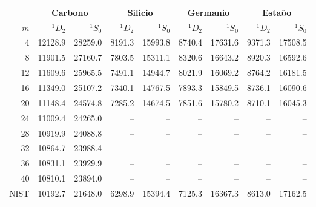 \begin{tabular}{rrrrrrrrr}
    \toprule
     & \multicolumn{2}{c}{\textbf{Carbono}} & \multicolumn{2}{c}{\textbf{Silicio}} & \multicolumn{2}{c}{\textbf{Germanio}} & \multicolumn{2}{c}{\textbf{Estaño}} \\
    $m$ & $^1D_2$ & $^1S_0$ & $^1D_2$ & $^1S_0$ & $^1D_2$ & $^1S_0$ & $^1D_2$ & $^1S_0$ \\
    \midrule
    4 & 12128.9 & 28259.0 & 8191.3 & 15993.8 & 8740.4 & 17631.6 & 9371.3 & 17508.5 \\
    8 & 11901.5 & 27160.7 & 7803.5 & 15311.1 & 8320.6 & 16643.2 & 8920.3 & 16592.6 \\
    12 & 11609.6 & 25965.5 & 7491.1 & 14944.7 & 8021.9 & 16069.2 & 8764.2 & 16181.5 \\
    16 & 11349.0 & 25107.2 & 7340.1 & 14767.5 & 7893.3 & 15849.5 & 8736.1 & 16090.6 \\
    20 & 11148.4 & 24574.8 & 7285.2 & 14674.5 & 7851.6 & 15780.2 & 8710.1 & 16045.3 \\
    24 & 11009.4 & 24265.0 & -- & -- & -- & -- & -- & -- \\
    28 & 10919.9 & 24088.8 & -- & -- & -- & -- & -- & -- \\
    32 & 10864.7 & 23988.4 & -- & -- & -- & -- & -- & -- \\
    36 & 10831.1 & 23929.9 & -- & -- & -- & -- & -- & -- \\
    40 & 10810.1 & 23894.0 & -- & -- & -- & -- & -- & -- \\
    \midrule
    NIST & 10192.7 & 21648.0 & 6298.9 & 15394.4 & 7125.3 & 16367.3 & 8613.0 & 17162.5 \\
    \bottomrule
\end{tabular}
